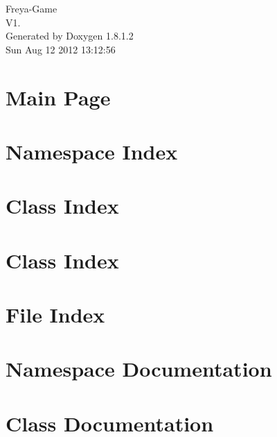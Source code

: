 \documentclass{book}
\begin{document}
\hypersetup{pageanchor=false,citecolor=blue}
\begin{titlepage}
\vspace*{7cm}
\begin{center}
{\Large Freya-\/\-Game \\[1ex]\large V1. }\\
\vspace*{1cm}
{\large Generated by Doxygen 1.8.1.2}\\
\vspace*{0.5cm}
{\small Sun Aug 12 2012 13:12:56}\\
\end{center}
\end{titlepage}
\clearemptydoublepage
{}
\tableofcontents
\clearemptydoublepage
{}
\hypersetup{pageanchor=true,citecolor=blue}
\chapter{Main Page}
\label{index}\hypertarget{index}{}
\chapter{Namespace Index}

\chapter{Class Index}

\chapter{Class Index}

\chapter{File Index}

\chapter{Namespace Documentation}

\chapter{Class Documentation}


























\end{document}
